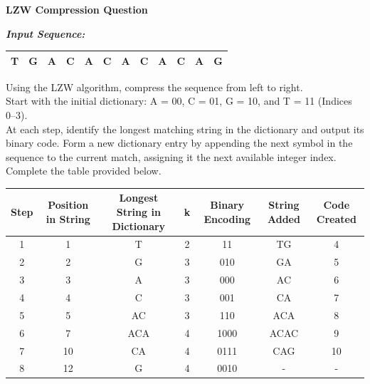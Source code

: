 \documentclass[11pt]{article}
\begin{document}
\begin{center}
{\Large \textbf{LZW Compression Question}}
\end{center}
\vspace{1em}
\noindent \textit{\textbf{Input Sequence:}}
\begin{center}
\renewcommand{\arraystretch}{1.5}
\begin{tabular}{|c|c|c|c|c|c|c|c|c|c|c|c|}
\hline
\rowcolor{white!95!black} T & G & A & C & A & C & A & C & A & C & A & G \\
\hline
\end{tabular}
\end{center}
\vspace{1em}
\noindent Using the LZW algorithm, compress the sequence from left to right. \\[1.5em]
Start with the initial dictionary: A = 00, C = 01, G = 10, and T = 11 (Indices 0--3). \\[1.5em]
At each step, identify the longest matching string in the dictionary and output its binary code. Form a new dictionary entry by appending the next symbol in the sequence to the current match, assigning it the next available integer index. Complete the table provided below.
\vspace{3em}
\par
{}
\vspace{1em}
\begin{center}
\small
\renewcommand{\arraystretch}{1.4}
\begin{tabular}{|c|c|c|c|c|c|c|}
\hline
\rowcolor{lightgray} Step & Position in String & Longest String in Dictionary & k & Binary Encoding & String Added & Code Created \\
\hline
1 & 1 & T & 2 & 11 & TG & 4 \\ \hline
2 & 2 & G & 3 & 010 & GA & 5 \\ \hline
3 & 3 & A & 3 & 000 & AC & 6 \\ \hline
4 & 4 & C & 3 & 001 & CA & 7 \\ \hline
5 & 5 & AC & 3 & 110 & ACA & 8 \\ \hline
6 & 7 & ACA & 4 & 1000 & ACAC & 9 \\ \hline
7 & 10 & CA & 4 & 0111 & CAG & 10 \\ \hline
8 & 12 & G & 4 & 0010 & - & - \\ \hline
\end{tabular}
\end{center}
\vspace{1em}
\end{document}
